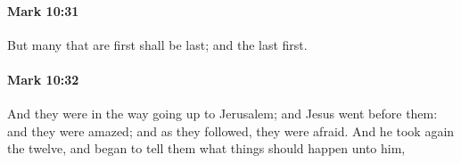 		\paragraph{Mark 10:31} %
			\label{MARK-10-31}

			But many that are first shall be last; and the last first.

			\begin{framed}
			\scriptsize
				\begin{compactdesc}
					\item[SBLG] 
				\end{compactdesc}
			\end{framed}

		\paragraph{Mark 10:32} %
			\label{MARK-10-32}

			And they were in the way going up to Jerusalem; and Jesus went before them: and they were amazed; and as they followed, they were afraid. And he took again the twelve, and began to tell them what things should happen unto him,

